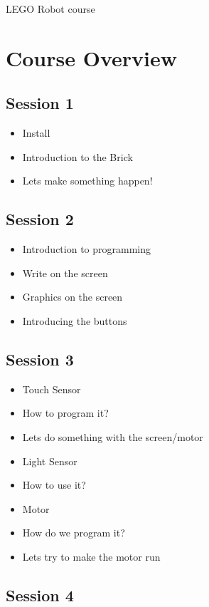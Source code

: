 \documentclass{article}
\begin{document}
{\Huge LEGO Robot course}

\section{Course Overview}

\subsection{Session 1}

\begin{itemize}
  \item Install
  \item Introduction to the Brick
  \item Lets make something happen!
\end{itemize}

\subsection{Session 2}

\begin{itemize}
  \item Introduction to programming
  \item Write on the screen
  \item Graphics on the screen
  \item Introducing the buttons
\end{itemize}

\subsection{Session 3}

\begin{itemize}
  \item Touch Sensor
  \item How to program it?
  \item Lets do something with the screen/motor
  \item Light Sensor
  \item How to use it? 
  \item Motor
  \item How do we program it?
  \item Lets try to make the motor run
\end{itemize}

\subsection{Session 4}
\end{document}
